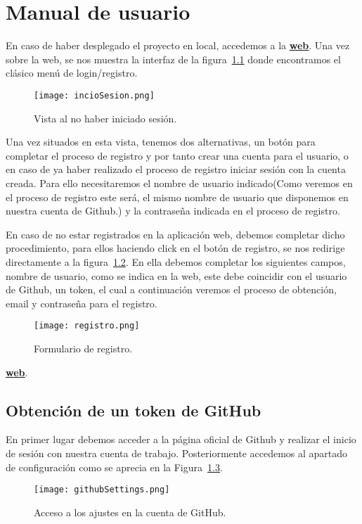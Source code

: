 \chapter{Manual de usuario\label{09manual}}

En caso de haber desplegado el proyecto en local, accedemos a la \textbf{\href{http://localhost:3000}{\underline{web}}}.
Una vez sobre la web, se nos muestra la interfaz de la figura~\ref{figure:inicioSesion} donde encontramos el clásico menú de login/registro.

\begin{figure}[h!]
  \texttt{[image: incioSesion.png]}
  \caption{Vista al no haber iniciado sesión.}
  \label{figure:inicioSesion}
\end{figure}

Una vez situados en esta vista, tenemos dos alternativas, un botón para completar el proceso de registro y por tanto crear una cuenta para el usuario, o en caso de ya haber realizado el proceso de registro iniciar sesión con la cuenta creada. Para ello necesitaremos el nombre de usuario indicado(Como veremos en el proceso de registro este será, el mismo nombre de usuario que disponemos en nuestra cuenta de Github.) y la contraseña indicada en el proceso de registro.


En caso de no estar registrados en la aplicación web, debemos completar dicho procedimiento, para ellos haciendo click en el botón de registro, se nos redirige directamente a la figura~\ref{figure:registro}. En ella debemos completar los siguientes campos, nombre de usuario, como se indica en la web, este debe coincidir con el usuario de Github, un token, el cual a continuación veremos el proceso de obtención, email y contraseña para el registro.

\begin{figure}[h!]
  \texttt{[image: registro.png]}
  \caption{Formulario de registro.}
  \label{figure:registro}
\end{figure}


\textbf{\href{http://localhost:3000}{\underline{web}}}.


\section{Obtención de un token de GitHub}

En primer lugar debemos acceder a la página oficial de Github\cite{GitHub} y realizar el inicio de sesión con nuestra cuenta de trabajo. Posteriormente accedemos al apartado de configuración como se aprecia en la Figura~\ref{figure:settingsGitHub}.
\begin{figure}[h!]
  \texttt{[image: githubSettings.png]}
  \caption{Acceso a los ajustes en la cuenta de GitHub.}
  \label{figure:settingsGitHub}
\end{figure}

